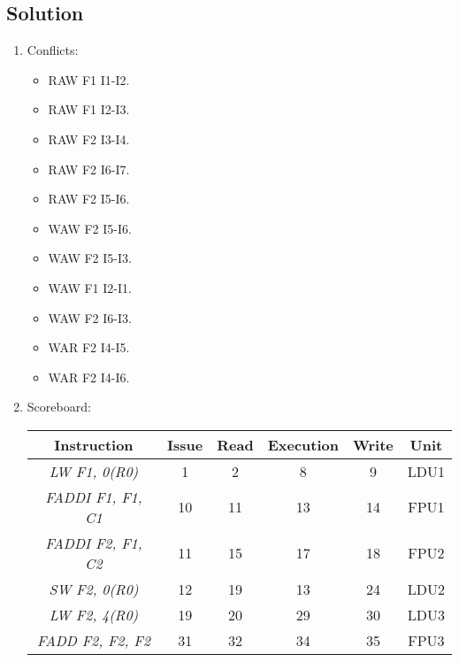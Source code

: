 \subsection*{Solution}
\begin{enumerate}
    \item Conflicts:
        \begin{itemize}
            \item RAW F1 I1-I2.
            \item RAW F1 I2-I3.
            \item RAW F2 I3-I4.
            \item RAW F2 I6-I7.
            \item RAW F2 I5-I6.
            \item WAW F2 I5-I6.
            \item WAW F2 I5-I3.
            \item WAW F1 I2-I1.
            \item WAW F2 I6-I3.
            \item WAR F2 I4-I5.
            \item WAR F2 I4-I6.
        \end{itemize}
    \item Scoreboard:
        \begin{table}[H]
            \centering
            \begin{tabular}{c|cccc|c}
            \textbf{Instruction}      & \textbf{Issue} & \textbf{Read} & \textbf{Execution} & \textbf{Write} & \textbf{Unit} \\ \hline
            \textit{LW F1, 0(R0)}     & 1              & 2             & 8                  & 9              & LDU1          \\
            \textit{FADDI F1, F1, C1} & 10             & 11            & 13                 & 14             & FPU1          \\
            \textit{FADDI F2, F1, C2} & 11             & 15            & 17                 & 18             & FPU2          \\
            \textit{SW F2, 0(R0)}     & 12             & 19            & 13                 & 24             & LDU2          \\
            \textit{LW F2, 4(R0)}     & 19             & 20            & 29                 & 30             & LDU3          \\
            \textit{FADD F2, F2, F2}  & 31             & 32            & 34                 & 35             & FPU3          \\

\end{tabular}
\end{table}
\end{enumerate}
